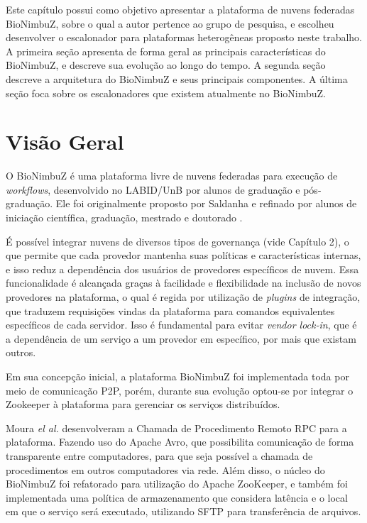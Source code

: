 Este capítulo possui como objetivo apresentar a plataforma de nuvens federadas BioNimbuZ, sobre o qual a autor pertence ao grupo de pesquisa, e escolheu desenvolver o escalonador para plataformas heterogêneas proposto neste trabalho. A primeira seção apresenta de forma geral as principais características do BioNimbuZ, e descreve sua evolução ao longo do tempo. A segunda seção descreve a arquitetura do BioNimbuZ e seus principais componentes. A última seção foca sobre os escalonadores que existem atualmente no BioNimbuZ.

\section{Visão Geral}

O BioNimbuZ é uma plataforma livre de nuvens federadas para execução de \textit{workflows}, desenvolvido no \acrfull{LABID}/\acrshort{UnB} por alunos de graduação e pós-graduação. Ele foi originalmente proposto por Saldanha\cite{Saldanha_BioNimbus} e refinado por alunos de iniciação científica, graduação, mestrado e doutorado\cite{BioNimbuZ_Breno_Deric} \cite{BioNimbuZ_6846526} \cite{6732620_BioNimbuZ_ACOsched} \cite{BioNimbuZ_Willian_C99} \cite{closer12_BioNimbuZ_AHP} \cite{BioNimbuZ_Vegara}.

É possível integrar nuvens de diversos tipos de governança (vide Capítulo 2), o que permite que cada provedor mantenha suas políticas e características internas, e isso reduz a dependência dos usuários de provedores específicos de nuvem. Essa funcionalidade é alcançada graças à facilidade e flexibilidade na inclusão de novos provedores na plataforma, o qual é regida por utilização de \textit{plugins} de integração, que traduzem requisições vindas da plataforma para comandos equivalentes específicos de cada servidor. Isso é fundamental para evitar \textit{vendor lock-in}\cite{VendorLockInDef}, que é a dependência de um serviço a um provedor em específico, por mais que existam outros.

Em sua concepção inicial, a plataforma BioNimbuZ foi implementada toda por meio de comunicação \acrfull{P2P}, porém, durante sua evolução optou-se por integrar o Zookeeper\cite{Zookeeper} à plataforma para gerenciar os serviços distribuídos. %

Moura \textit{el al.}\cite{BioNimbuZ_6846526} desenvolveram a Chamada de Procedimento Remoto \acrshort{RPC}\cite{RPC_1701928} para a plataforma. Fazendo uso do Apache Avro\cite{Avro}, que possibilita comunicação de forma transparente entre computadores, para que seja possível a chamada de procedimentos em outros computadores via rede. Além disso, o núcleo do BioNimbuZ foi refatorado para utilização do Apache ZooKeeper\cite{Zookeeper}, e também foi implementada uma política de armazenamento que considera latência e o local em que o serviço será executado, utilizando \acrfull{SFTP} para transferência de arquivos.

